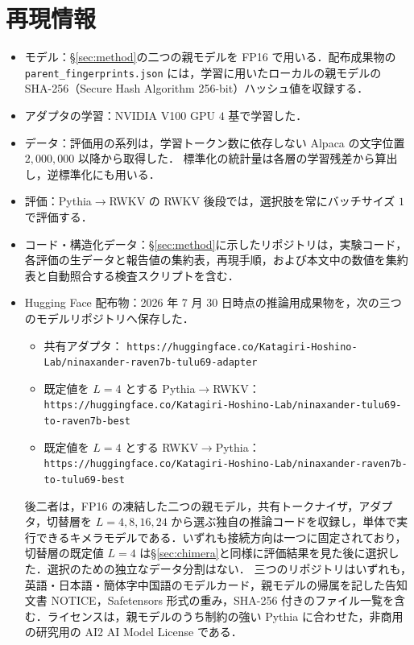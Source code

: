 \documentclass[techrep,noauthor]{ipsj}
\providecommand{\href}[2]{#2}
\newcommand{\RtoP}{RWKV$\to$\allowbreak Pythia}
\newcommand{\PtoR}{Pythia$\to$\allowbreak RWKV}
\newcommand{\hfrepo}[2]{%
  \href{#1}{%
    \texttt{https://huggingface.co/}\allowbreak\texttt{Katagiri-Hoshino-Lab/}\allowbreak\texttt{#2}}}
\begin{document}
\section{再現情報}\label{sec:repro}
{
\begin{itemize}\setlength{\itemsep}{0pt}\raggedright
\item モデル：\S\ref{sec:method}の二つの親モデルを FP16 で用いる．配布成果物の
\texttt{parent\_fingerprints.json} には，学習に用いたローカルの親モデルの SHA-256（Secure Hash Algorithm 256-bit）ハッシュ値を収録する．
\item アダプタの学習：NVIDIA V100 GPU $4$ 基で学習した．
\item データ：評価用の系列は，学習トークン数に依存しない Alpaca の文字位置 $2{,}000{,}000$ 以降から取得した．
標準化の統計量は各層の学習残差から算出し，逆標準化にも用いる．
\item 評価：\PtoR{} の RWKV 後段では，選択肢を常にバッチサイズ $1$ で評価する．
\item コード・構造化データ：\S\ref{sec:method}に示したリポジトリは，実験コード，各評価の生データと報告値の集約表，再現手順，および本文中の数値を集約表と自動照合する検査スクリプトを含む．
\item Hugging Face 配布物：2026 年 7 月 30 日時点の推論用成果物を，次の三つのモデルリポジトリへ保存した．
\begin{itemize}\setlength{\itemsep}{0pt}\raggedright
\item 共有アダプタ：\hfrepo
  {https://huggingface.co/Katagiri-Hoshino-Lab/ninaxander-raven7b-tulu69-adapter}
  {ninaxander-raven7b-tulu69-adapter}
\item 既定値を $L{=}4$ とする \PtoR{}：\hfrepo
  {https://huggingface.co/Katagiri-Hoshino-Lab/ninaxander-tulu69-to-raven7b-best}
  {ninaxander-tulu69-to-raven7b-best}
\item 既定値を $L{=}4$ とする \RtoP{}：\hfrepo
  {https://huggingface.co/Katagiri-Hoshino-Lab/ninaxander-raven7b-to-tulu69-best}
  {ninaxander-raven7b-to-tulu69-best}
\end{itemize}
後二者は，FP16 の凍結した二つの親モデル，共有トークナイザ，アダプタ，切替層を $L{=}4,8,16,24$ から選ぶ独自の推論コードを収録し，単体で実行できるキメラモデルである．いずれも接続方向は一つに固定されており，切替層の既定値 $L{=}4$ は\S\ref{sec:chimera}と同様に評価結果を見た後に選択した．選択のための独立なデータ分割はない．
三つのリポジトリはいずれも，英語・日本語・簡体字中国語のモデルカード，親モデルの帰属を記した告知文書 NOTICE，Safetensors 形式の重み，SHA-256 付きのファイル一覧を含む．ライセンスは，親モデルのうち制約の強い Pythia に合わせた，非商用の研究用の AI2 AI Model License である．
\end{itemize}
}
\end{document}
